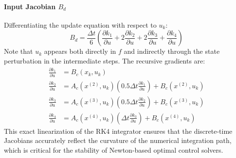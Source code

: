 \paragraph{Input Jacobian \texorpdfstring{$B_d$}{Bd}}
Differentiating the update equation with respect to $u_k$:
\begin{equation}
    B_d = \frac{\Delta t}{6} \left( \frac{\partial k_1}{\partial u} + 2\frac{\partial k_2}{\partial u} + 2\frac{\partial k_3}{\partial u} + \frac{\partial k_4}{\partial u} \right)
\end{equation}
Note that $u_k$ appears both directly in $f$ and indirectly through the state perturbation in the intermediate steps. The recursive gradients are:
\begin{align}
    \frac{\partial k_1}{\partial u} &= B_c(x_k, u_k) \\
    \frac{\partial k_2}{\partial u} &= A_c(x^{(2)}, u_k) \left( 0.5 \Delta t \frac{\partial k_1}{\partial u} \right) + B_c(x^{(2)}, u_k) \\
    \frac{\partial k_3}{\partial u} &= A_c(x^{(3)}, u_k) \left( 0.5 \Delta t \frac{\partial k_2}{\partial u} \right) + B_c(x^{(3)}, u_k) \\
    \frac{\partial k_4}{\partial u} &= A_c(x^{(4)}, u_k) \left( \Delta t \frac{\partial k_3}{\partial u} \right) + B_c(x^{(4)}, u_k)
\end{align}
This exact linearization of the RK4 integrator ensures that the discrete-time Jacobians accurately reflect the curvature of the numerical integration path, which is critical for the stability of Newton-based optimal control solvers.



